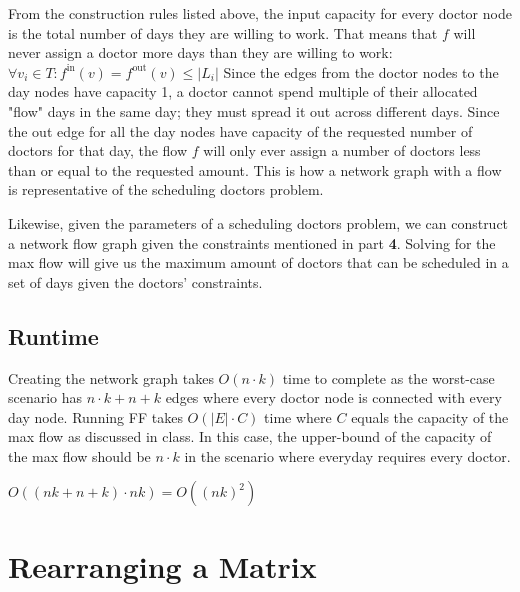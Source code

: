 \documentclass{article}
\begin{document}
From the construction rules listed above, the input capacity for every doctor node is the total number of days they are willing to work.
That means that $f$ will never assign a doctor more days than they are willing to work: $\forall v_i\in T: f^{\text{in}}(v) = f^{\text{out}}(v) \leq |L_i|$
Since the edges from the doctor nodes to the day nodes have capacity 1, a doctor cannot spend multiple of their allocated "flow" days in the same day; they must spread it out across different days.
Since the out edge for all the day nodes have capacity of the requested number of doctors for that day, the flow $f$ will only ever assign a number of doctors less than or equal to the requested amount.
This is how a network graph with a flow is representative of the scheduling doctors problem.

Likewise, given the parameters of a scheduling doctors problem, we can construct a network flow graph given the constraints mentioned in part \textbf{4}.
Solving for the max flow will give us the maximum amount of doctors that can be scheduled in a set of days given the doctors' constraints.

\subsection{Runtime}
Creating the network graph takes $O(n \cdot k)$ time to complete as the worst-case scenario has $n \cdot k + n + k$ edges where every doctor node is connected with every day node.
Running FF takes $O(|E| \cdot C)$ time where $C$ equals the capacity of the max flow as discussed in class.
In this case, the upper-bound of the capacity of the max flow should be $n \cdot k$ in the scenario where everyday requires every doctor.

$O((nk + n + k) \cdot nk) = O((nk)^2)$ 

\newpage
\section{Rearranging a Matrix}
\end{document}
